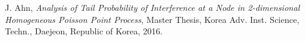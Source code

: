 \documentclass[master,english,final]{kaist-ucs} %
\begin{document}

    \begin{publication}
        \item J. Ahn, \textit{Analysis of Tail Probability of Interference at a Node in 2-dimensional Homogeneous Poisson Point Process}, Master Thesis, Korea Adv. Inst. Science, Techn., Daejeon, Republic of Korea, 2016.
    \end{publication}

  \label{paperlastpagelabel}     %
\end{document}
